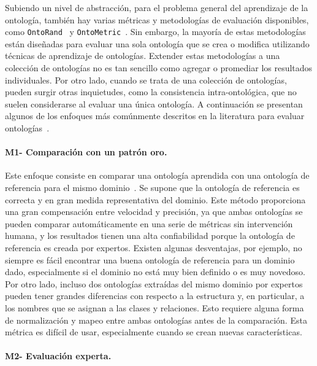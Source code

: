 Subiendo un nivel de abstracción, para el problema general del aprendizaje de la ontología, también hay varias métricas y metodologías de evaluación disponibles, como \texttt{OntoRand}~\cite{ontorand} y \texttt{OntoMetric}~\cite{ontometric}.
Sin embargo, la mayoría de estas metodologías están diseñadas para evaluar una sola ontología que se crea o modifica utilizando técnicas de aprendizaje de ontologías.
Extender estas metodologías a una colección de ontologías no es tan sencillo como agregar o promediar los resultados individuales.
Por otro lado, cuando se trata de una colección de ontologías, pueden surgir otras inquietudes, como la consistencia intra-ontológica, que no suelen considerarse al evaluar una única ontología.
A continuación se presentan algunos de los enfoques más comúnmente descritos en la literatura para evaluar ontologías~\cite{petasis2011ontology}.

\paragraph{M1- Comparación con un patrón oro.}

Este enfoque consiste en comparar una ontología aprendida con una ontología de referencia para el mismo dominio~\cite{corcoglioniti2016frame}.
Se supone que la ontología de referencia es correcta y en gran medida representativa del dominio.
Este método proporciona una gran compensación entre velocidad y precisión, ya que ambas ontologías se pueden comparar automáticamente en una serie de métricas sin intervención humana, y los resultados tienen una alta confiabilidad porque la ontología de referencia es creada por expertos.
Existen algunas desventajas, por ejemplo, no siempre es fácil encontrar una buena ontología de referencia para un dominio dado, especialmente si el dominio no está muy bien definido o es muy novedoso.
Por otro lado, incluso dos ontologías extraídas del mismo dominio por expertos pueden tener grandes diferencias con respecto a la estructura y, en particular, a los nombres que se asignan a las clases y relaciones.
Esto requiere alguna forma de normalización y mapeo entre ambas ontologías antes de la comparación.
Esta métrica es difícil de usar, especialmente cuando se crean nuevas características.

\paragraph{M2- Evaluación experta.}

